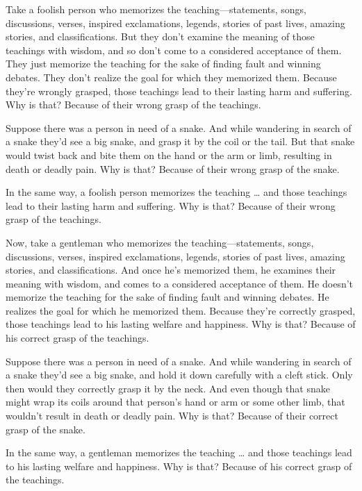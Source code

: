 \documentclass[12pt,openany]{book}%
\begin{document}
Take a foolish person who memorizes the teaching—statements, songs, discussions, verses, inspired exclamations, legends, stories of past lives, amazing stories, and classifications. But they don’t examine the meaning of those teachings with wisdom, and so don’t come to a considered acceptance of them. They just memorize the teaching for the sake of finding fault and winning debates. They don’t realize the goal for which they memorized them. Because they’re wrongly grasped, those teachings lead to their lasting harm and suffering. Why is that? Because of their wrong grasp of the teachings. 

Suppose there was a person in need of a snake. And while wandering in search of a snake they’d see a big snake, and grasp it by the coil or the tail. But that snake would twist back and bite them on the hand or the arm or limb, resulting in death or deadly pain. Why is that? Because of their wrong grasp of the snake. 

In the same way, a foolish person memorizes the teaching … and those teachings lead to their lasting harm and suffering. Why is that? Because of their wrong grasp of the teachings. 

Now, take a gentleman who memorizes the teaching—statements, songs, discussions, verses, inspired exclamations, legends, stories of past lives, amazing stories, and classifications. And once he’s memorized them, he examines their meaning with wisdom, and comes to a considered acceptance of them. He doesn’t memorize the teaching for the sake of finding fault and winning debates. He realizes the goal for which he memorized them. Because they’re correctly grasped, those teachings lead to his lasting welfare and happiness. Why is that? Because of his correct grasp of the teachings. 

Suppose there was a person in need of a snake. And while wandering in search of a snake they’d see a big snake, and hold it down carefully with a cleft stick. Only then would they correctly grasp it by the neck. And even though that snake might wrap its coils around that person’s hand or arm or some other limb, that wouldn’t result in death or deadly pain. Why is that? Because of their correct grasp of the snake. 

In the same way, a gentleman memorizes the teaching … and those teachings lead to his lasting welfare and happiness. Why is that? Because of his correct grasp of the teachings. 
\end{document}
